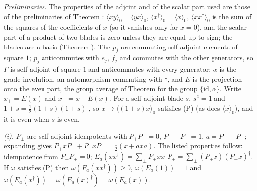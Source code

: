 \emph{Preliminaries.} The properties of the adjoint and of the scalar part used are those of the preliminaries of Theorem : $\langle xy\rangle_{0} = \langle yx\rangle_{0}$, $\langle x^{\dagger}\rangle_{0} = \langle x\rangle_{0}$, $\langle xx^{\dagger}\rangle_{0}$ is the sum of the squares of the coefficients of $x$ (so it vanishes only for $x = 0$), and the scalar part of a product of two blades is zero unless they are equal up to sign; the blades are a basis (Theorem ). The $p_{j}$ are commuting self-adjoint elements of square $1$; $p_{j}$ anticommutes with $e_{j}$, $f_{j}$ and commutes with the other generators, so $\Gamma$ is self-adjoint of square $1$ and anticommutes with every generator: $\alpha$ is the grade involution, an automorphism commuting with $\dagger$, and $E$ is the projection onto the even part, the group average of Theorem  for the group $\{\mathrm{id}, \alpha\}$. Write $x_{+} = E(x)$ and $x_{-} = x - E(x)$. For a self-adjoint blade $s$, $s^{2} = 1$ and $1 \pm s = \tfrac12(1 \pm s)(1 \pm s)^{\dagger}$, so $x \mapsto \langle(1 \pm s)x\rangle_{0}$ satisfies (P) (as does $\langle x\rangle_{0}$), and it is even when $s$ is even.

\emph{(i).} $P_{\pm}$ are self-adjoint idempotents with $P_{+}P_{-} = 0$, $P_{+} + P_{-} = 1$, $a = P_{+} - P_{-}$; expanding gives $P_{+}xP_{+} + P_{-}xP_{-} = \tfrac12(x + axa)$. The listed properties follow: idempotence from $P_{\pm}P_{\mp} = 0$; $E_{a}(xx^{\dagger}) = \sum_{\pm}P_{\pm}xx^{\dagger}P_{\pm} = \sum_{\pm}(P_{\pm}x)(P_{\pm}x)^{\dagger}$. If $\omega$ satisfies (P) then $\omega(E_{a}(xx^{\dagger})) \ge 0$, $\omega(E_{a}(1)) = 1$ and $\omega(E_{a}(x^{\dagger})) = \omega(E_{a}(x)^{\dagger}) = \omega(E_{a}(x))$.


